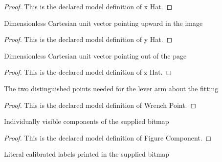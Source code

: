\begin{proof}
  This is the declared model definition of x Hat.
\end{proof}
\begin{definition}[y Hat]
  \label{def:physics:phyx-mini-0823:phyxminiproblems-problemphyxmini0823-yhat}
  Dimensionless Cartesian unit vector pointing upward in the image
\end{definition}
\begin{proof}
  This is the declared model definition of y Hat.
\end{proof}
\begin{definition}[z Hat]
  \label{def:physics:phyx-mini-0823:phyxminiproblems-problemphyxmini0823-zhat}
  Dimensionless Cartesian unit vector pointing out of the page
\end{definition}
\begin{proof}
  This is the declared model definition of z Hat.
\end{proof}
\begin{definition}
  \label{def:physics:phyx-mini-0823:phyxminiproblems-problemphyxmini0823-wrenchpoint}
  The two distinguished points needed for the lever arm about the fitting
\end{definition}
\begin{proof}
  This is the declared model definition of Wrench Point.
\end{proof}
\begin{definition}
  \label{def:physics:phyx-mini-0823:phyxminiproblems-problemphyxmini0823-figurecomponent}
  Individually visible components of the supplied bitmap
\end{definition}
\begin{proof}
  This is the declared model definition of Figure Component.
\end{proof}
\begin{definition}
  \label{def:physics:phyx-mini-0823:phyxminiproblems-problemphyxmini0823-figurelabel}
  Literal calibrated labels printed in the supplied bitmap
\end{definition}
